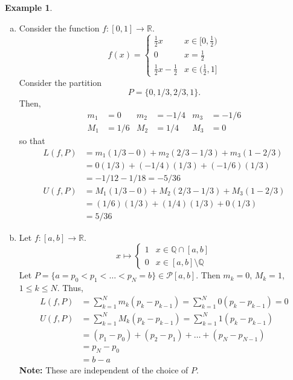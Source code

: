 \documentclass[11pt]{article}
\theoremstyle{definition}
\newtheorem{exmp}[thm]{Example}
\newcommand{\mbQ}{\ensuremath{\mathbb{Q}}}
\newcommand{\mbR}{\ensuremath{\mathbb{R}}}
\begin{document}
\begin{exmp}~ \vspace{-0.2cm}

\begin{enumerate}[(a)]

\item Consider the function $f : [0, 1] \to \mbR$.
$$ f(x) = \begin{cases}
			\frac12x & x \in [0, \frac12) \\
			0 & x = \frac12 \\
			\frac12x - \frac12 & x \in (\frac12, 1]
             \end{cases} $$
Consider the partition
$$P = \{0, 1/3, 2/3, 1\} \text{.}$$
Then,
\begin{align*}
m_1 & = 0 & m_2 & = -1/4 & m_3 & = -1/6 \\
M_1 & = 1/6 & M_2 & = 1/4 & M_3 & = 0
\end{align*}
so that
\begin{align*}
L(f, P) & = m_1 \left(1/3 - 0\right) + m_2 \left(2/3 - 1/3\right) + m_3 \left(1 - 2/3\right) \\
	   & = 0 \left(1/3\right) + \left(-1/4\right)\left(1/3\right) + \left(-1/6\right)\left(1/3\right) \\
	   & = -1/12 - 1/18 = -5/36 \\
U(f, P) & = M_1 \left(1/3 - 0\right) + M_2 \left(2/3 - 1/3\right) + M_3 \left(1 - 2/3\right) \\
	    & = (1/6) \left(1/3\right) + (1/4) \left(1/3\right) + 0\left(1/3\right) \\
	    & = 5/36
\end{align*}

\item Let $f : [a, b] \to \mbR$.
$$x \mapsto \begin{cases}
				1 & x \in \mbQ \cap [a, b] \\
				0 & x \in [a, b] \setminus \mbQ
			\end{cases} $$
Let $P = \{a = p_0 < p_1 < \hdots < p_N = b\} \in \mathcal{P}[a, b]$. 
Then $m_k = 0$, $M_k = 1$, $1 \leq k \leq N$. Thus,
\begin{align*}
L(f, P) & = \sum_{k=1}^N m_k (p_k - p_{k-1}) = \sum_{k=1}^N 0(p_k - p_{k-1}) = 0 \\
U(f, P) & = \sum_{k=1}^N M_k (p_k - p_{k-1}) = \sum_{k=1}^N 1 (p_k - p_{k-1}) \\
	    & = (p_1 - p_0) + (p_2 - p_1) + \hdots + (p_N - p_{N-1}) \\
	    & = p_N - p_0 \\
	    & = b - a
\end{align*}
\textbf{Note:} These are independent of the choice of $P$. 


\end{enumerate}
\end{exmp}
\end{document}
